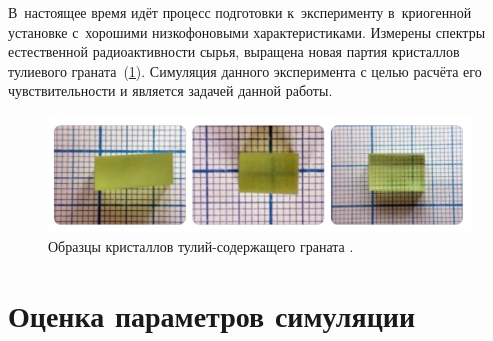 \documentclass[a4paper,article,14pt]{extarticle}
\begin{document}
В~настоящее время идёт процесс подготовки к~эксперименту в~криогенной установке с~хорошими низкофоновыми характеристиками.
Измерены спектры естественной радиоактивности сырья, выращена новая партия кристаллов тулиевого граната~(\ref{fig:crystals}).
Симуляция данного эксперимента с целью расчёта его чувствительности и является задачей данной работы.
\begin{figure}[t]
    \centering
    \includegraphics[width=.9\textwidth]{images/Crystals.png}
    \caption{Образцы кристаллов тулий-содержащего граната {\TmAlO}.}\label{fig:crystals}
\end{figure}


\pagebreak
\section{Оценка параметров симуляции}
\end{document}
